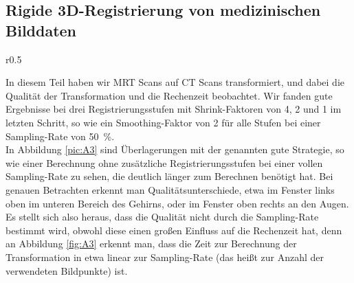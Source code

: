 \subsection{Rigide 3D-Registrierung von medizinischen Bilddaten}
\begin{wrapfigure}{r}{0.5\linewidth}
  \vspace{-10pt}
  \caption{}
  \label{fig:A3}
  \vspace{-10pt}
  \resizebox{\linewidth}{!}{}
  \vspace{-30pt}
\end{wrapfigure}
In diesem Teil haben wir MRT Scans auf CT Scans transformiert, und dabei die
Qualität der Transformation und die Rechenzeit beobachtet. Wir fanden gute
Ergebnisse bei drei Registrierungsstufen mit Shrink-Faktoren von \num{4},
\num{2} und \num{1} im letzten Schritt, so wie ein Smoothing-Faktor von \num{2}
für alle Stufen bei einer Sampling-Rate von \SI{50}{\percent}.\\
In Abbildung \ref{pic:A3} sind Überlagerungen mit der genannten gute Strategie,
so wie einer Berechnung ohne zusätzliche Registrierungsstufen bei einer vollen
Sampling-Rate zu sehen, die deutlich länger zum Berechnen benötigt hat. Bei
genauen Betrachten erkennt man Qualitätsunterschiede, etwa im Fenster links
oben im unteren Bereich des Gehirns, oder im Fenster oben rechts an den Augen.
Es stellt sich also heraus, dass die Qualität nicht durch die Sampling-Rate
bestimmt wird, obwohl diese einen großen Einfluss auf die Rechenzeit hat, denn
an Abbildung \ref{fig:A3} erkennt man, dass die Zeit zur Berechnung der
Transformation in etwa linear zur Sampling-Rate (das heißt zur Anzahl der
verwendeten Bildpunkte) ist.
\newpage

